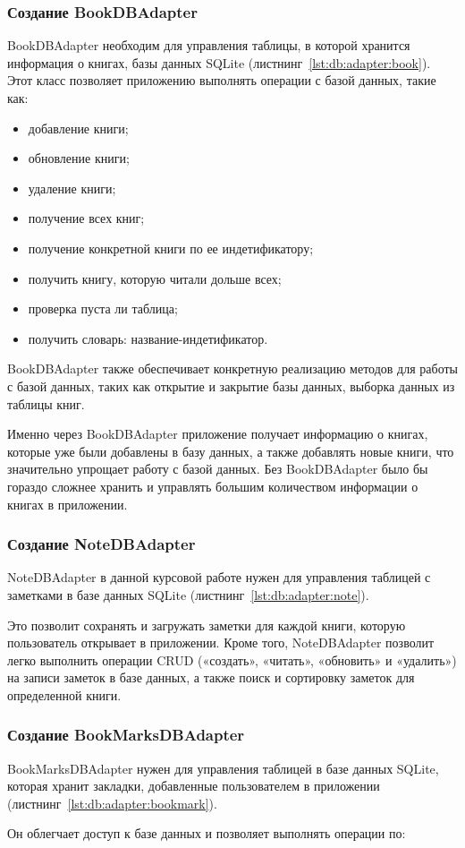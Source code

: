 \subsubsection{Создание BookDBAdapter}
BookDBAdapter необходим для управления таблицы, в которой хранится информация
о книгах, базы данных SQLite (листнинг~\ref{lst:db:adapter:book}).
Этот класс позволяет приложению выполнять операции
с базой данных, такие как:

\begin{itemize}
	\item добавление книги;
	\item обновление книги;
	\item удаление книги; 
	\item получение всех книг;
	\item получение конкретной книги по ее индетификатору;
	\item получить книгу, которую читали дольше всех;
	\item проверка пуста ли таблица;
	\item получить словарь: название-индетификатор.
\end{itemize}

BookDBAdapter также обеспечивает конкретную реализацию методов
для работы с базой данных, таких как открытие и закрытие базы данных,
выборка данных из таблицы книг.\par
Именно через BookDBAdapter приложение получает информацию о книгах,
которые уже были добавлены в базу данных, а также добавлять новые книги,
что значительно упрощает работу с базой данных.
Без BookDBAdapter было бы гораздо сложнее хранить
и управлять большим количеством информации о книгах в приложении.

\subsubsection{Создание NoteDBAdapter}
NoteDBAdapter в данной курсовой работе нужен для управления таблицей
с заметками в базе данных SQLite
(листнинг~\ref{lst:db:adapter:note}).\par
Это позволит сохранять и загружать заметки для каждой книги,
которую пользователь открывает в приложении.
Кроме того, NoteDBAdapter позволит легко выполнить операции
CRUD («создать», «читать», «обновить» и «удалить») на записи заметок
в базе данных, а также поиск и сортировку заметок для определенной книги.

\subsubsection{Создание BookMarksDBAdapter}
BookMarksDBAdapter нужен для управления таблицей в базе данных SQLite,
которая хранит закладки, добавленные пользователем в приложении
(листнинг~\ref{lst:db:adapter:bookmark}).\par
Он облегчает доступ к базе данных и позволяет выполнять
операции по:

